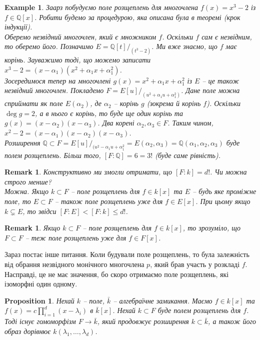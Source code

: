\documentclass[a4paper, 10pt]{article}
\theoremstyle{theoremdd}
\theoremstyle{theoremdd}
\theoremstyle{theoremdd}
\theoremstyle{theoremdd}
\theoremstyle{theoremdd}
\newtheorem{example}[theorem]{Example}
\theoremstyle{theoremdd}
\theoremstyle{theoremdd}
\theoremstyle{theoremdd}
\theoremstyle{theoremdd}
\newtheorem{proposition}[theorem]{Proposition}
\theoremstyle{theoremdd}
\theoremstyle{theoremdd}
\newtheorem{remark}[theorem]{Remark}
\theoremstyle{theoremdd}
\theoremstyle{theoremdd}
\theoremstyle{theoremdd}
\theoremstyle{theoremdd}
\begin{document}
\begin{example}
Заарз побудуємо поле розщеплень для многочлена $f(x) = x^3 -2$ із $f \in \mathbb{Q}[x]$. Робити будемо за процедурою, яка описана була в теоремі (крок індукції).\\
Оберемо незвідний многочлен, який є множником $f$. Оскільки $f$ сам є незвідним, то оберемо його. Позначимо $E = \mathbb{Q}[t]/_{(t^3-2)}$. Ми вже знаємо, що $f$ має корінь. Зауважимо тоді, що можемо записати $x^3 - 2 = (x-\alpha_1)(x^2+\alpha_1 x + \alpha_1^2)$.\\
Зосередимося тепер на многочлені $g(x) = x^2  +\alpha_1 x + \alpha_1^2$ із $E$ -- це також незвідний многочлен. Покладемо $F = E[u]/_{(u^2 + \alpha_1 u + \alpha_1^2)}$. Дане поле можна сприймати як поле $E(\alpha_2)$, де $\alpha_2$ -- корінь $g$ (зокрема й корінь $f$). Оскільки $\deg g = 2$, а в нього є корінь, то буде ще один корінь та $g(x) = (x-\alpha_2)(x-\alpha_3)$. Два корені $\alpha_2,\alpha_3 \in F$. Таким чином, $x^2 - 2 = (x-\alpha_1)(x-\alpha_2)(x-\alpha_3)$.\\
Розширення $\mathbb{Q} \subset F = E[u]/_{(u^2-\alpha_1u + \alpha_1^2} = E(\alpha_2,\alpha_3) = \mathbb{Q}(\alpha_1,\alpha_2,\alpha_3)$ буде полем розщеплень. Більш того, $[F:\mathbb{Q}] = 6 = 3!$ (буде саме рівність).
\end{example}

\begin{remark}
Конструктивно ми змогли отримати, що $[F:k] = d!$. Чи можна строго менше?\\
Можна. Якщо $k \subset F$ -- поле розщеплень для $f \in k[x]$ та $E$ -- будь яке проміжне поле, то $E \subset F$ -- також поле розщеплень уже для $f \in E[x]$. При цьому якщо $k \subsetneq E$, то звідси $[F:E] < [F:k] \leq d!$.
\end{remark}

\begin{remark}
Якщо $k \subset F$ -- поле розщеплень для $f \in k[x]$, то зрозуміло, що $F \subset F$ -- теж поле розщеплень уже для $f \in F[x]$.
\end{remark}

Зараз постає інше питання. Коли будували поле розщеплень, то була залежність від обрання незвідного монічного многочлена $p$, який брав участь у розкладі $f$. Насправді, це не має значення, бо скоро отримаємо поле розщеплень, які ізоморфні один одному.

\begin{proposition}
Нехай $k$ -- поле, $\bar{k}$ -- алгебраїчне замикання. Маємо $f \in k[x]$ та $f(x) = c\displaystyle\prod_{i=1}^d (x-\lambda_i)$ в $\bar{k}[x]$. Нехай $k \subset F$ буде полем розщеплень для $f$. Тоді існує гомоморфізм $F \to \bar{k}$, який продовжує розширення $k \subset \bar{k}$, а також його образ дорівнює $k(\lambda_1,\dots,\lambda_d)$.
\end{proposition}
\end{document}
